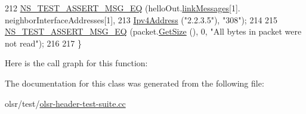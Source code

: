 \begin{DoxyCode}
212   \hyperlink{group__testing_ga2a9d78cffb3db8e867c35fff0b698cf5}{NS\_TEST\_ASSERT\_MSG\_EQ} (helloOut.\hyperlink{structns3_1_1olsr_1_1MessageHeader_1_1Hello_aa6eb8d2a413314c764f5eaf669655f59}{linkMessages}[1].
      neighborInterfaceAddresses[1],
213                          \hyperlink{classns3_1_1Ipv4Address}{Ipv4Address} (\textcolor{stringliteral}{"2.2.3.5"}), \textcolor{stringliteral}{"308"});
214 
215   \hyperlink{group__testing_ga2a9d78cffb3db8e867c35fff0b698cf5}{NS\_TEST\_ASSERT\_MSG\_EQ} (packet.\hyperlink{classns3_1_1Packet_a462855c9929954d4301a4edfe55f4f1c}{GetSize} (), 0, \textcolor{stringliteral}{"All bytes in packet were not
       read"});
216 
217 \}
\end{DoxyCode}


Here is the call graph for this function\+:




The documentation for this class was generated from the following file\+:\begin{DoxyCompactItemize}
\item 
olsr/test/\hyperlink{olsr-header-test-suite_8cc}{olsr-\/header-\/test-\/suite.\+cc}\end{DoxyCompactItemize}
